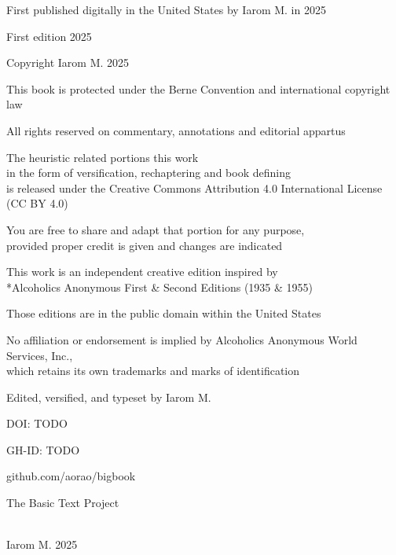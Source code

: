 \begin{legalchapter}

First published digitally in the United States by Iarom M. in 2025

First edition 2025

Copyright \textcopyright Iarom M. 2025

This book is protected under the Berne Convention and international copyright law

All rights reserved on commentary, annotations and editorial appartus

The heuristic related portions this work \\
    in the form of versification, rechaptering and book defining \\
    is released under the Creative Commons Attribution 4.0 International License (CC BY 4.0)

You are free to share and adapt that portion for any purpose, \\
    provided proper credit is given and changes are indicated

This work is an independent creative edition inspired by \\
    *Alcoholics Anonymous First \& Second Editions (1935 \& 1955)

Those editions are in the public domain within the United States

No affiliation or endorsement is implied by Alcoholics Anonymous World Services, Inc., \\
    which retains its own trademarks and marks of identification

Edited, versified, and typeset by Iarom M.

DOI: TODO

GH-ID: TODO

github.com/aorao/bigbook

The Basic Text Project



\vfill
\bbtitle \\
\textcopyright Iarom M. 2025

\end{legalchapter}
